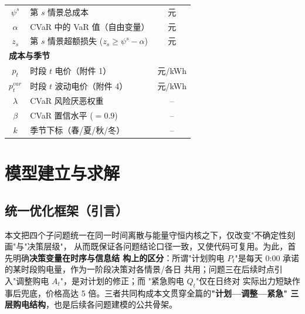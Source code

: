 \documentclass[withoutpreface]{cumcmthesis}
\begin{document}
\begin{table}[H]
\begin{tabular}{clc}
        $\psi^s$ & 第 $s$ 情景总成本 & 元 \\
        $\alpha$ & CVaR 中的 VaR 值（自由变量） & 元 \\
        $z_s$ & 第 $s$ 情景超额损失 ($z_s\ge\psi^s-\alpha$) & 元 \\
        \midrule[0.5pt]
        \multicolumn{3}{l}{\bf 成本与季节} \\
        $p_t$ & 时段 $t$ 电价（附件 1） & 元/kWh \\
        $p_t^{var}$ & 时段 $t$ 波动电价（附件 4） & 元/kWh \\
        $\lambda$ & CVaR 风险厌恶权重 & -- \\
        $\beta$ & CVaR 置信水平 ($=0.9$) & -- \\
        $k$ & 季节下标（春/夏/秋/冬） & -- \\
        \bottomrule[0.8pt]
    \end{tabular}
\end{table}

\section{模型建立与求解}

\subsection*{统一优化框架（引言）}
本文把四个子问题统一在同一时间离散与能量守恒内核之下，仅改变"不确定性刻画"与"决策层级"，
从而既保证各问题结论口径一致，又使代码可复用。为此，首先明确\textbf{决策变量在时序与信息结
构上的区分}：所谓"计划购电 $P_t$"是每天 0:00 承诺的某时段购电量，作为一阶段决策对各情景/各日
共用；问题三在后续时点引入"调整购电 $A_t$"，是对计划的修正；而 "紧急购电 $Q_t$"仅在日终对
实际出力短缺作事后兜底，价格高达 5 倍。三者共同构成本文贯穿全篇的\textbf{"计划—调整—紧急"
三层购电结构}，也是后续各问题建模的公共骨架。
\end{document}
